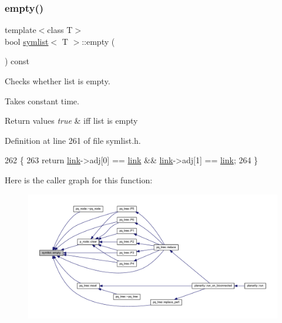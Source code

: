 \subsubsection{\texorpdfstring{empty()}{empty()}}
{\footnotesize\ttfamily template$<$class T$>$ \\
bool \mbox{\hyperlink{classsymlist}{symlist}}$<$ T $>$\+::empty (\begin{DoxyParamCaption}{ }\end{DoxyParamCaption}) const\hspace{0.3cm}{\ttfamily [inline]}}



Checks whether list is empty. 

Takes constant time.


\begin{DoxyRetVals}{Return values}
{\em true} & iff list is empty \\
\hline
\end{DoxyRetVals}


Definition at line 261 of file symlist.\+h.


\begin{DoxyCode}
262     \{
263     \textcolor{keywordflow}{return} \mbox{\hyperlink{classsymlist_a8fa81a7f6d0bb986bb593776db582c90}{link}}->adj[0] == \mbox{\hyperlink{classsymlist_a8fa81a7f6d0bb986bb593776db582c90}{link}} && \mbox{\hyperlink{classsymlist_a8fa81a7f6d0bb986bb593776db582c90}{link}}->adj[1] == \mbox{\hyperlink{classsymlist_a8fa81a7f6d0bb986bb593776db582c90}{link}};
264     \}
\end{DoxyCode}
Here is the caller graph for this function\+:\nopagebreak
\begin{figure}[H]
\begin{center}
\leavevmode
\includegraphics[width=350pt]{classsymlist_aca11cd6c621376bc52a18828ef92e753_icgraph}
\end{center}
\end{figure}
\mbox{\label{classsymlist_a7283589fa01f79d722f8256d7a6a7883}} 
